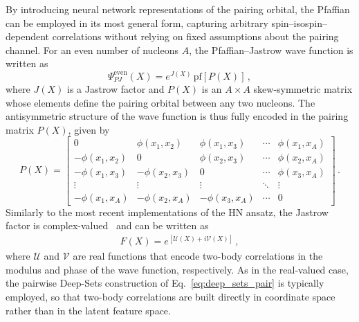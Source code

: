 By introducing neural network representations of the pairing orbital, the Pfaffian can be employed in its most general form, capturing arbitrary spin–isospin–dependent correlations without relying on fixed assumptions about the pairing channel.
For an even number of nucleons $A$, the Pfaffian--Jastrow wave function is written as
\begin{equation}
\Psi_{PJ}^{\mathrm{even}}(X) = e^{J(X)}\, \mathrm{pf}[P(X)]\,,
\label{eq:pf_even}
\end{equation}
where $J(X)$ is a Jastrow factor and $P(X)$ is an $A \times A$ skew-symmetric matrix whose elements define the pairing orbital between any two nucleons.
The antisymmetric structure of the wave function is thus fully encoded in the pairing matrix $P(X)$, given by~\cite{kim_neural-network_2024,fore_investigating_2024}
\begin{equation}
P(X) =
\begin{bmatrix}
0 & \phi(x_1,x_2) & \phi(x_1,x_3) & \cdots & \phi(x_1,x_A) \\
-\phi(x_1,x_2) & 0 & \phi(x_2,x_3) & \cdots & \phi(x_2,x_A) \\
-\phi(x_1,x_3) & -\phi(x_2,x_3) & 0 & \cdots & \phi(x_3,x_A) \\
\vdots & \vdots & \vdots & \ddots & \vdots \\
-\phi(x_1,x_A) & -\phi(x_2,x_A) & -\phi(x_3,x_A) & \cdots & 0
\end{bmatrix} \, .
\end{equation}
Similarly to the most recent implementations of the HN ansatz, the Jastrow factor is complex-valued~\cite{fore_investigating_2024} and can be written as
\begin{align}
F(X) = e^{\left[\mathcal{U}(X) + i\mathcal{V}(X)\right]}\,,
\label{eq:jastrow_complex}
\end{align}
where $\mathcal{U}$ and $\mathcal{V}$ are real functions that encode two-body correlations in the modulus and phase of the wave function, respectively.
As in the real-valued case, the pairwise Deep-Sets construction of Eq.~\eqref{eq:deep_sets_pair} is typically employed, so that two-body correlations are built directly in coordinate space rather than in the latent feature space.


